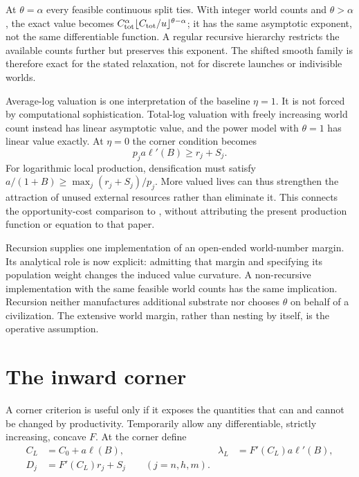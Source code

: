 At $\theta=\alpha$ every feasible continuous split ties. With integer
world counts and $\theta>\alpha$, the exact value becomes
$C_{\rm tot}^\alpha\lfloor C_{\rm tot}/u\rfloor^{\theta-\alpha}$;
it has the same asymptotic exponent, not the same differentiable function.
A regular recursive hierarchy restricts the available counts further but
preserves this exponent. The shifted smooth family is therefore exact for
the stated relaxation, not for discrete launches or indivisible worlds.

Average-log valuation is one interpretation of the baseline $\eta=1$.
It is not forced by computational sophistication. Total-log valuation
with freely increasing world count instead has linear asymptotic value,
and the power model with $\theta=1$ has linear value exactly. At
$\eta=0$ the corner condition becomes
\begin{equation}
 p_ja\ell'(B)\geq r_j+S_j.
 \label{eq:totalist-corner}
\end{equation}
For logarithmic local production, densification must satisfy
$a/(1+B)\geq\max_j(r_j+S_j)/p_j$. More valued lives can thus strengthen
the attraction of unused external resources rather than eliminate it.
This connects the opportunity-cost comparison to
\citet{Bostrom2003Waste}, without attributing the present production
function or equation to that paper.

Recursion supplies one implementation of an open-ended world-number
margin. Its analytical role is now explicit: admitting that margin and
specifying its population weight changes the induced value curvature.
A non-recursive implementation with the same feasible world counts has
the same implication. Recursion neither manufactures additional substrate
nor chooses $\theta$ on behalf of a civilization. The extensive world
margin, rather than nesting by itself, is the operative assumption.

\section{The inward corner}
\label{sec:inward}
\label{sec:threshold}

A corner criterion is useful only if it exposes the quantities that can
and cannot be changed by productivity. Temporarily allow any
differentiable, strictly increasing, concave $F$. At the corner define
\begin{align}
 C_L&=C_0+a\ell(B),&
 \lambda_L&=F'(C_L)a\ell'(B),\label{eq:local-return}\\
 D_j&=F'(C_L)r_j+S_j\qquad(j=n,h,m).
 \label{eq:external-return}
\end{align}

